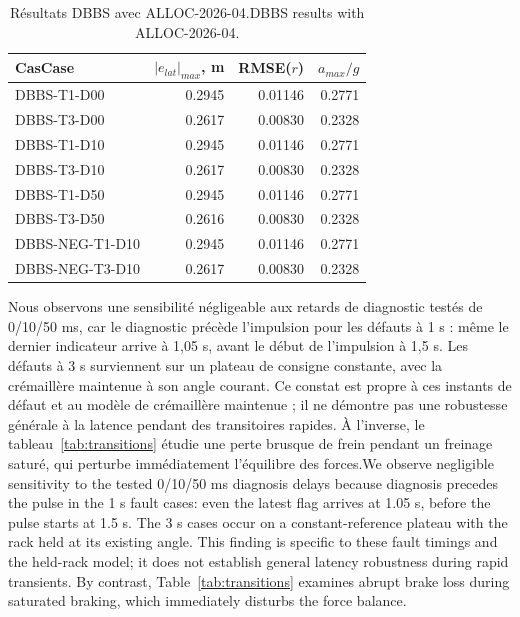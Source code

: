 \documentclass[11pt,a4paper,oneside]{report}
\newcommand{\bi}[2]{\iffrench #2\else #1\fi}
\begin{document}
\begin{table}[H]\centering\caption{\bi{DBBS results with ALLOC-2026-04.}{Résultats DBBS avec ALLOC-2026-04.}}
\begin{tabularx}{\textwidth}{@{}Yrrr@{}}\toprule
\bi{Case}{Cas} & $|e_{lat}|_{max}$, m & RMSE($r$) & $a_{max}/g$\\\midrule

DBBS-T1-D00 & 0.2945 & 0.01146 & 0.2771 \\
DBBS-T3-D00 & 0.2617 & 0.00830 & 0.2328 \\
DBBS-T1-D10 & 0.2945 & 0.01146 & 0.2771 \\
DBBS-T3-D10 & 0.2617 & 0.00830 & 0.2328 \\
DBBS-T1-D50 & 0.2945 & 0.01146 & 0.2771 \\
DBBS-T3-D50 & 0.2616 & 0.00830 & 0.2328 \\
DBBS-NEG-T1-D10 & 0.2945 & 0.01146 & 0.2771 \\
DBBS-NEG-T3-D10 & 0.2617 & 0.00830 & 0.2328 \\
\bottomrule\end{tabularx}\end{table}
\bi{We observe negligible sensitivity to the tested 0/10/50 ms diagnosis delays because diagnosis precedes the pulse in the 1 s fault cases: even the latest flag arrives at 1.05 s, before the pulse starts at 1.5 s. The 3 s cases occur on a constant-reference plateau with the rack held at its existing angle. This finding is specific to these fault timings and the held-rack model; it does not establish general latency robustness during rapid transients. By contrast, Table~\ref{tab:transitions} examines abrupt brake loss during saturated braking, which immediately disturbs the force balance.}{Nous observons une sensibilité négligeable aux retards de diagnostic testés de 0/10/50 ms, car le diagnostic précède l'impulsion pour les défauts à 1 s : même le dernier indicateur arrive à 1,05 s, avant le début de l'impulsion à 1,5 s. Les défauts à 3 s surviennent sur un plateau de consigne constante, avec la crémaillère maintenue à son angle courant. Ce constat est propre à ces instants de défaut et au modèle de crémaillère maintenue ; il ne démontre pas une robustesse générale à la latence pendant des transitoires rapides. À l'inverse, le tableau~\ref{tab:transitions} étudie une perte brusque de frein pendant un freinage saturé, qui perturbe immédiatement l'équilibre des forces.}
\end{document}
